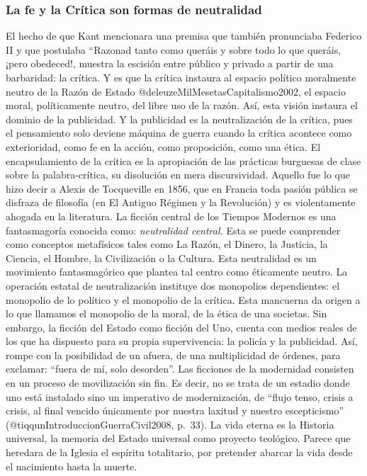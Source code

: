 \documentclass[
]{article}
\begin{document}
\hypertarget{la-fe-y-la-cruxedtica-son-formas-de-neutralidad}{%
\subsubsection{La fe y la Crítica son formas de
neutralidad}\label{la-fe-y-la-cruxedtica-son-formas-de-neutralidad}}

El hecho de que Kant mencionara una premisa que también pronunciaba
Federico II y que postulaba ``Razonad tanto como queráis y sobre todo lo
que queráis, ¡pero obedeced!, muestra la escisión entre público y
privado a partir de una barbaridad: la crítica. Y es que la crítica
instaura al espacio político moralmente neutro de la Razón de Estado
@deleuzeMilMesetasCapitalismo2002, el espacio moral, políticamente
neutro, del libre uso de la razón. Así, esta visión instaura el dominio
de la publicidad. Y la publicidad es la neutralización de la crítica,
pues el pensamiento solo deviene máquina de guerra cuando la crítica
acontece como exterioridad, como fe en la acción, como proposición, como
una ética. El encapsulamiento de la crítica es la apropiación de las
prácticas burguesas de clase sobre la palabra-crítica, su disolución en
mera discursividad. Aquello fue lo que hizo decir a Alexis de
Tocqueville en 1856, que en Francia toda pasión pública se disfraza de
filosofía (en El Antiguo Régimen y la Revolución) y es violentamente
ahogada en la literatura. La ficción central de los Tiempos Modernos es
una fantasmagoría conocida como: \emph{neutralidad central.} Esta se
puede comprender como conceptos metafísicos tales como La Razón, el
Dinero, la Justicia, la Ciencia, el Hombre, la Civilización o la
Cultura. Esta neutralidad es un movimiento fantasmagórico que plantea
tal centro como éticamente neutro. La operación estatal de
neutralización instituye dos monopolios dependientes: el monopolio de lo
político y el monopolio de la crítica. Esta mancuerna da origen a lo que
llamamos el monopolio de la moral, de la ética de una societas. Sin
embargo, la ficción del Estado como ficción del Uno, cuenta con medios
reales de los que ha dispuesto para su propia supervivencia: la policía
y la publicidad. Así, rompe con la posibilidad de un afuera, de una
multiplicidad de órdenes, para exclamar: ``fuera de mí, solo desorden''.
Las ficciones de la modernidad consisten en un proceso de movilización
sin fin. Es decir, no se trata de un estadio donde uno está instalado
sino un imperativo de modernización, de ``flujo tenso, crisis a crisis,
al final vencido únicamente por nuestra laxitud y nuestro escepticismo''
(@tiqqunIntroduccionGuerraCivil2008, p.~33). La vida eterna es la
Historia universal, la memoria del Estado universal como proyecto
teológico. Parece que heredara de la Iglesia el espíritu totalitario,
por pretender abarcar la vida desde el nacimiento hasta la muerte.
\end{document}
